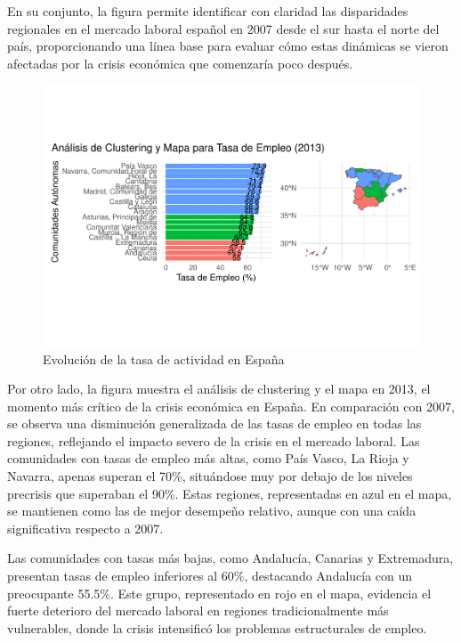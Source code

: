 \documentclass[notspecified,article,submit,moreauthors,pdftex]{Definitions/mdpi}
\begin{document}
En su conjunto, la figura permite identificar con claridad las
disparidades regionales en el mercado laboral español en 2007 desde el
sur hasta el norte del país, proporcionando una línea base para evaluar
cómo estas dinámicas se vieron afectadas por la crisis económica que
comenzaría poco después.

\begin{figure}[h]

{\centering \includegraphics[width=1\linewidth]{ProyectoAED2024_files/figure-latex/unnamed-chunk-36-1} 

}

\caption{Evolución de la tasa de actividad en España}\label{fig:unnamed-chunk-36}
\end{figure}

Por otro lado, la figura muestra el análisis de clustering y el mapa en
2013, el momento más crítico de la crisis económica en España. En
comparación con 2007, se observa una disminución generalizada de las
tasas de empleo en todas las regiones, reflejando el impacto severo de
la crisis en el mercado laboral. Las comunidades con tasas de empleo más
altas, como País Vasco, La Rioja y Navarra, apenas superan el 70\%,
situándose muy por debajo de los niveles precrisis que superaban el
90\%. Estas regiones, representadas en azul en el mapa, se mantienen
como las de mejor desempeño relativo, aunque con una caída significativa
respecto a 2007.

Las comunidades con tasas más bajas, como Andalucía, Canarias y
Extremadura, presentan tasas de empleo inferiores al 60\%, destacando
Andalucía con un preocupante 55.5\%. Este grupo, representado en rojo en
el mapa, evidencia el fuerte deterioro del mercado laboral en regiones
tradicionalmente más vulnerables, donde la crisis intensificó los
problemas estructurales de empleo.
\end{document}
